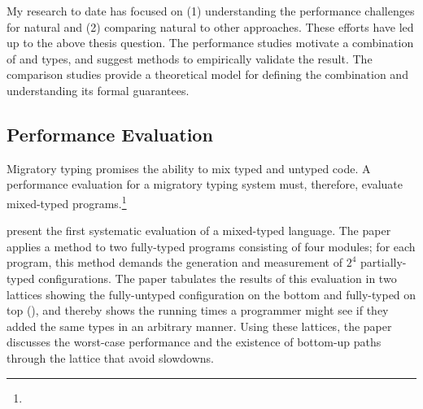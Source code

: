 %
%
%

My research to date has focused on
 (1) understanding the performance challenges for natural
 and (2) comparing natural to other approaches.
These efforts have led up to the above thesis question.
The performance studies motivate a combination of \tdeep{} and \tshallow{}
 types, and suggest methods to empirically validate the result.
The comparison studies provide a theoretical model for defining the
 combination and understanding its formal guarantees.

%



\subsection{Performance Evaluation}

Migratory typing promises the ability to mix typed and untyped code.
A performance evaluation for a migratory typing system must, therefore,
 evaluate mixed-typed programs.\footnote{}

\citet{tfdfftf-ecoop-2015} present the first systematic evaluation
 of a mixed-typed language.
The paper applies a method to two fully-typed programs consisting of four
 modules; for each program, this method demands the generation and
 measurement of $2^4$ partially-typed configurations.
The paper tabulates the results of this evaluation in two lattices showing
 the fully-untyped configuration on the bottom and fully-typed on top
 (),
 and thereby shows the running times a programmer
 might see if they added the same types in an arbitrary manner.
Using these lattices, the paper discusses the worst-case performance
 and the existence of bottom-up paths through the lattice that avoid slowdowns.

